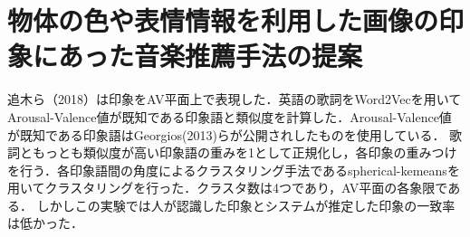 \section{物体の色や表情情報を利用した画像の印象にあった音楽推薦手法の提案}
追木ら（2018）\cite{7}は印象をAV平面上で表現した．英語の歌詞をWord2Vecを用いてArousal-Valence値が既知である印象語と類似度を計算した．Arousal-Valence値が既知である印象語はGeorgios(2013)\cite{8}らが公開されしたものを使用している．
歌詞ともっとも類似度が高い印象語の重みを1として正規化し，各印象の重みつけを行う．各印象語間の角度によるクラスタリング手法であるspherical-kemeans\cite{9}を用いてクラスタリングを行った．クラスタ数は4つであり，AV平面の各象限である．
しかしこの実験では人が認識した印象とシステムが推定した印象の一致率は低かった．